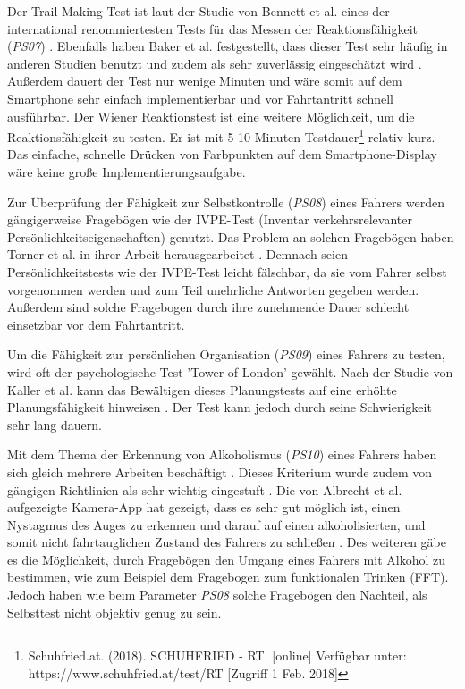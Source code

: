 Der Trail-Making-Test  ist laut der Studie von Bennett et al. eines der international renommiertesten Tests für das Messen der Reaktionsfähigkeit (\textit{PS07}) \cite{cognitivetestsfitnesstodrive}. Ebenfalls haben Baker et al. festgestellt, dass dieser Test sehr häufig in anderen Studien benutzt  und zudem als sehr zuverlässig eingeschätzt wird \cite{reviewofassessmenttests}. Außerdem dauert der Test nur wenige Minuten und wäre somit auf dem Smartphone sehr einfach implementierbar und vor Fahrtantritt schnell ausführbar. Der Wiener Reaktionstest ist eine weitere Möglichkeit, um die Reaktionsfähigkeit zu testen. Er ist mit 5-10 Minuten Testdauer\footnote{Schuhfried.at. (2018). SCHUHFRIED - RT. [online] Verfügbar unter: https://www.schuhfried.at/test/RT [Zugriff 1 Feb. 2018]} relativ kurz. Das einfache, schnelle Drücken von Farbpunkten auf dem Smartphone-Display wäre keine große Implementierungsaufgabe.

Zur Überprüfung der Fähigkeit zur Selbstkontrolle (\textit{PS08}) eines Fahrers werden gängigerweise Fragebögen wie der IVPE-Test (Inventar verkehrsrelevanter Persönlichkeitseigenschaften) genutzt. Das Problem an solchen Fragebögen haben Torner et al. in ihrer Arbeit herausgearbeitet \cite{verfalschbarkeitivpe}. Demnach seien Persönlichkeitstests wie der IVPE-Test leicht fälschbar, da sie vom Fahrer selbst vorgenommen werden und zum Teil unehrliche Antworten gegeben werden. Außerdem sind solche Fragebogen durch ihre zunehmende Dauer schlecht einsetzbar vor dem Fahrtantritt.

Um die Fähigkeit zur persönlichen Organisation (\textit{PS09}) eines Fahrers zu testen, wird oft der psychologische Test 'Tower of London' gewählt. Nach der Studie von Kaller et al. kann das Bewältigen dieses Planungstests auf eine erhöhte Planungsfähigkeit hinweisen \cite{toweroflondon}. Der Test kann jedoch durch seine Schwierigkeit sehr lang dauern.

Mit dem Thema der Erkennung von Alkoholismus (\textit{PS10}) eines Fahrers haben sich gleich mehrere Arbeiten beschäftigt \cite{mobilesmarttracking,sobrietymobiletests}. Dieses Kriterium wurde zudem von gängigen Richtlinien als sehr wichtig eingestuft \cite{begutachtungsrichtlinien,testverfahrenpsychometrischefahreignung,beurteilungskriterien,drivervehiclelicencingagency}. Die von Albrecht et al. aufgezeigte Kamera-App hat gezeigt, dass es sehr gut möglich ist, einen Nystagmus des Auges zu erkennen und darauf auf einen alkoholisierten, und somit nicht fahrtauglichen Zustand des Fahrers zu schließen \cite{mobilesmarttracking}. Des weiteren gäbe es die Möglichkeit, durch Fragebögen den Umgang eines Fahrers mit Alkohol zu bestimmen, wie zum Beispiel dem Fragebogen zum funktionalen Trinken (FFT). Jedoch haben wie beim Parameter \textit{PS08} solche Fragebögen den Nachteil, als Selbsttest nicht objektiv genug zu sein.

